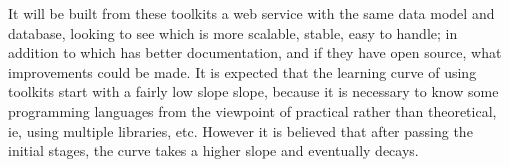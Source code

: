 It will be built from these toolkits a web service with the same data model and
database, looking to see which is more scalable, stable, easy to handle; in
addition to which has better documentation, and if they have open source, what
improvements could be made. It is expected that the learning curve of using
toolkits start with a fairly low slope slope, because it is necessary to know
some programming languages from the viewpoint of practical rather than
theoretical, ie, using multiple libraries, etc. However it is believed that
after passing the initial stages, the curve takes a higher slope and eventually
decays.

